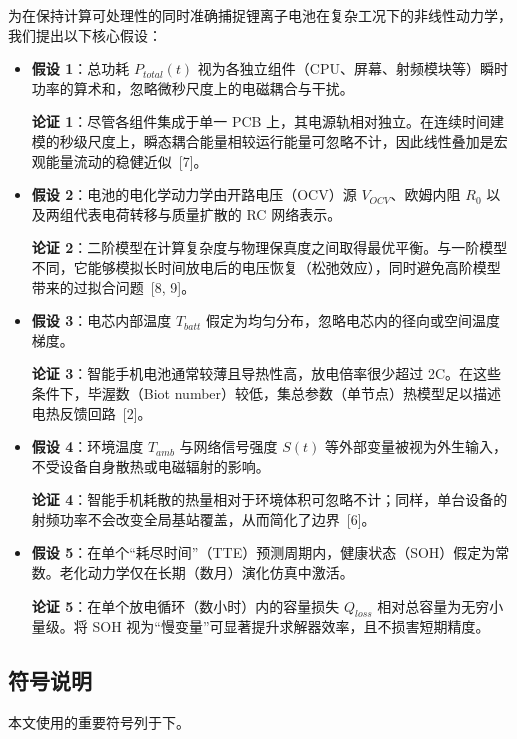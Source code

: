 \documentclass[11pt,a4paper]{ctexart}
\begin{document}
为在保持计算可处理性的同时准确捕捉锂离子电池在复杂工况下的非线性动力学，我们提出以下核心假设：

\begin{itemize}
\item \textbf{假设 1}：总功耗 $P_{total}(t)$ 视为各独立组件（CPU、屏幕、射频模块等）瞬时功率的算术和，忽略微秒尺度上的电磁耦合与干扰。

\textbf{论证 1}：尽管各组件集成于单一 PCB 上，其电源轨相对独立。在连续时间建模的秒级尺度上，瞬态耦合能量相较运行能量可忽略不计，因此线性叠加是宏观能量流动的稳健近似~[7]。
\item \textbf{假设 2}：电池的电化学动力学由开路电压（OCV）源 $V_{OCV}$、欧姆内阻 $R_0$ 以及两组代表电荷转移与质量扩散的 RC 网络表示。

\textbf{论证 2}：二阶模型在计算复杂度与物理保真度之间取得最优平衡。与一阶模型不同，它能够模拟长时间放电后的电压恢复（松弛效应），同时避免高阶模型带来的过拟合问题~[8, 9]。
\item \textbf{假设 3}：电芯内部温度 $T_{batt}$ 假定为均匀分布，忽略电芯内的径向或空间温度梯度。

\textbf{论证 3}：智能手机电池通常较薄且导热性高，放电倍率很少超过 2C。在这些条件下，毕渥数（Biot number）较低，集总参数（单节点）热模型足以描述电热反馈回路~[2]。
\item \textbf{假设 4}：环境温度 $T_{amb}$ 与网络信号强度 $S(t)$ 等外部变量被视为外生输入，不受设备自身散热或电磁辐射的影响。

\textbf{论证 4}：智能手机耗散的热量相对于环境体积可忽略不计；同样，单台设备的射频功率不会改变全局基站覆盖，从而简化了边界~[6]。
\item \textbf{假设 5}：在单个“耗尽时间”（TTE）预测周期内，健康状态（SOH）假定为常数。老化动力学仅在长期（数月）演化仿真中激活。

\textbf{论证 5}：在单个放电循环（数小时）内的容量损失 $Q_{loss}$ 相对总容量为无穷小量级。将 SOH 视为“慢变量”可显著提升求解器效率，且不损害短期精度。
\end{itemize}

\subsection{符号说明}

本文使用的重要符号列于下。
\end{document}
